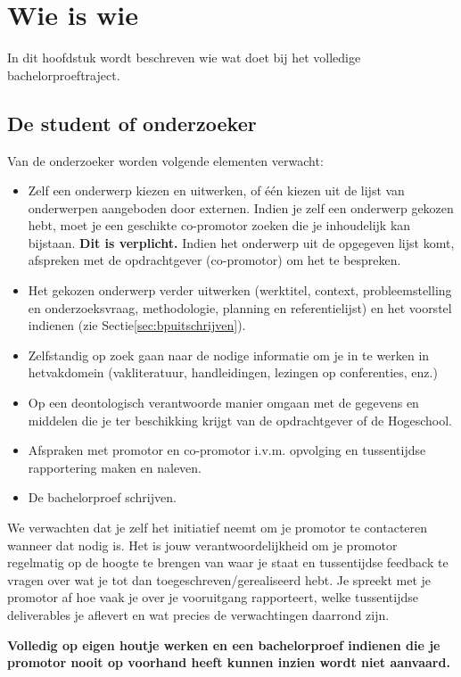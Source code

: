 \chapter{Wie is wie}

In dit hoofdstuk wordt beschreven wie wat doet bij het volledige bachelorproeftraject.
\section{De student of onderzoeker}
Van de onderzoeker worden volgende elementen verwacht:
\begin{itemize}
	\item Zelf een onderwerp kiezen en uitwerken, of één kiezen uit de lijst van onderwerpen aangeboden door externen. Indien je zelf een onderwerp gekozen hebt, moet je een geschikte co-promotor zoeken die je inhoudelijk kan bijstaan. \textbf{Dit is verplicht.} Indien het onderwerp uit de opgegeven lijst komt, afspreken met de opdrachtgever (co-promotor) om het te bespreken.
	\item Het gekozen onderwerp verder uitwerken (werktitel, context, probleemstelling en onderzoeksvraag,  methodologie,  planning en referentielijst)   en het voorstel indienen (zie Sectie\ref{sec:bpuitschrijven}).
	\item Zelfstandig op zoek gaan naar de nodige informatie om je in te werken in hetvakdomein (vakliteratuur, handleidingen, lezingen op conferenties, enz.)
	\item Op een deontologisch verantwoorde manier omgaan met de gegevens en middelen die je ter beschikking krijgt van de opdrachtgever of de Hogeschool.
	\item Afspraken met promotor en co-promotor i.v.m. opvolging en tussentijdse rapportering maken en naleven.
	\item De bachelorproef schrijven.
\end{itemize}
We verwachten dat je zelf het initiatief neemt om je promotor te contacteren wanneer dat nodig is. Het is jouw verantwoordelijkheid om je promotor regelmatig op de hoogte te brengen van waar je staat en tussentijdse feedback te vragen over wat je tot dan toegeschreven/gerealiseerd hebt. Je spreekt met je promotor af hoe vaak je over je vooruitgang rapporteert, welke tussentijdse deliverables je aflevert en wat precies de verwachtingen daarrond zijn. 

\textbf{Volledig op eigen houtje werken en een bachelorproef indienen die je promotor nooit op voorhand heeft kunnen inzien wordt niet aanvaard.}


